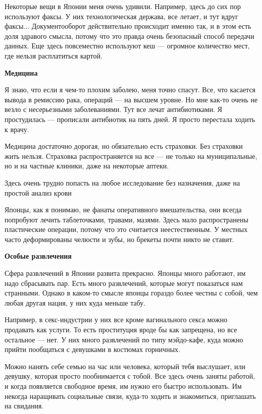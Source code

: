 Некоторые вещи в Японии меня очень удивили. Например, здесь до сих пор используют факсы. У них технологическая держава, все летает, и тут вдруг факсы... Документооборот действительно происходит именно так, и в этом есть доля здравого смысла, потому что это правда очень безопасный способ передачи данных. Еще здесь повсеместно используют кеш — огромное количество мест, где нельзя расплатиться картой.

\textbf{Медицина}

Я знаю, что если я чем-то плохим заболею, меня точно спасут. Все, что касается вывода в ремиссию рака, операций — на высшем уровне. Но мне как-то очень не везло с несерьезными заболеваниями. Тут все лечат антибиотиками. Я простудилась — прописали антибиотик на пять дней. Я просто перестала ходить к врачу.

Медицина достаточно дорогая, но обязательно есть страховки. Без страховки жить нельзя. Страховка распространяется на все — не только на муниципальные, но и на частные клиники, даже на некоторые аптеки.

\begin{fancyquotes}
    Здесь очень трудно попасть на любое исследование без назначения, даже на простой анализ крови
\end{fancyquotes}

Японцы, как я понимаю, не фанаты оперативного вмешательства, они всегда попробуют лечить таблеточками, травами, мазями. Здесь мало распространены пластические операции, потому что это считается неестественным. У местных часто деформированы челюсти и зубы, но брекеты почти никто не ставит.

\textbf{Особые развлечения}

Сфера развлечений в Японии развита прекрасно. Японцы много работают, им надо сбрасывать пар. Есть много развлечений, которые могут показаться нам странными. Однако в каком-то смысле японцы гораздо более честны с собой, чем любая другая нация, у них куда меньше табу.

Например, в секс-индустрии у них все кроме вагинального секса можно продавать как услуги. То есть проституция вроде бы как запрещена, но все остальное — нет. У них много развлечений по типу мэйдо-кафе, куда можно прийти пообщаться с девушками в костюмах горничных.

Можно нанять себе семью на час или человека, который тебя выслушает, или девушку, которая просто пообнимается с тобой. Все здесь очень заняты работой, и когда появляется свободное время, им нужно его быстро использовать. Им некогда наращивать социальные связи, куда-то ходить и знакомиться, приглашать на свидания.

